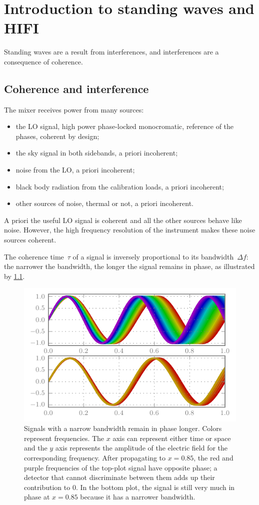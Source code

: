 \cleardoublepage
\chapter{Introduction to standing waves and HIFI}
Standing waves are a result from interferences, and interferences are a consequence of coherence.

\section{Coherence and interference}
The mixer receives power from many sources:
\begin{itemize}
    \item the LO signal, high power phase-locked monocromatic, reference of the phases, coherent by design;
    \item the sky signal in both sidebands, a priori incoherent;
    \item noise from the LO, a priori incoherent;
    \item black body radiation from the calibration loads, a priori incoherent;
    \item other sources of noise, thermal or not, a priori incoherent.
\end{itemize}
A priori the useful LO signal is coherent and all the other sources behave like noise.
However, the high frequency resolution of the instrument makes these noise sources coherent.

The coherence time~$\tau$ of a signal is inversely proportional to its bandwidth~$\Delta f$:
the narrower the bandwidth, the longer the signal remains in phase, as illustrated by \cref{fig:coherence}.
\begin{figure}[hbtp]
    \centering
    \includegraphics{coherence}
    \caption{
        Signals with a narrow bandwidth remain in phase longer.
        Colors represent frequencies.
        The $x$ axis can represent either time or space and the $y$ axis represents the amplitude of the electric field for the corresponding frequency.
        After propagating to $x=0.85$, the red and purple frequencies of the top-plot signal have opposite phase; a detector that cannot discriminate between them adds up their contribution to 0.
        In the bottom plot, the signal is still very much in phase at $x=0.85$
        because it has a narrower bandwidth.
    }
    \label{fig:coherence}
\end{figure}

